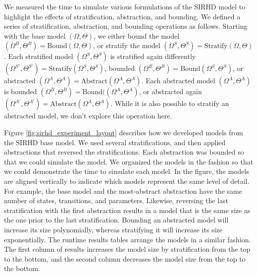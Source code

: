 We measured the time to simulate various formulations of the SIRHD model to highlight the effects of stratification, abstraction, and bounding.  We defined a series of stratification, abstraction, and bounding operations as follows.  Starting with the base model $(\Omega, \Theta)$, we either bound the model $(\Omega^B, \Theta^B)=\text{Bound}(\Omega, \Theta)$, or stratify the model $(\Omega^S, \Theta^S)=\text{Stratify}(\Omega, \Theta)$.  Each stratified model $(\Omega^S, \Theta^S)$ is stratified again differently $(\Omega^{S'}, \Theta^{S'})=\text{Stratify}(\Omega^S, \Theta^S)$, bounded $(\Omega^B, \Theta^B)=\text{Bound}(\Omega^S, \Theta^S)$, or abstracted $(\Omega^A, \Theta^A)=\text{Abstract}(\Omega^A, \Theta^A)$.  Each abstracted model $(\Omega^A, \Theta^A)$ is  bounded $(\Omega^B, \Theta^B)=\text{Bound}((\Omega^A, \Theta^A)$, or abstracted again $(\Omega^{A'}, \Theta^{A'})=\text{Abstract}(\Omega^A, \Theta^A)$.  While it is also possible to stratify an abstracted model, we don't explore this operation here.

Figure \ref{fig:sirhd_experiment_layout} describes how we developed models from the SIRHD base model.  We used several stratifications, and then applied abstractions that reversed the stratifications.  Each abstraction was bounded so that we could simulate the model.  We organized the models in the fashion so that we could demonstrate the time to simulate each model.  In the figure, the models are aligned vertically to indicate which models represent the same level of detail.  For example, the base model and the most-abstract abstraction have the same number of states, transitions, and parameters.  Likewise, reversing the last stratification with the first abstraction results in a model that is the same size as the one prior to the last stratification.  Bounding an abstracted model will increase its size polynomially, whereas stratifying it will increase its size exponentially.  The runtime results tables arrange the models in a similar fashion.  The first column of results increases the model size by stratification from the top to the bottom, and the second column decreases the model size from the top to the bottom.


